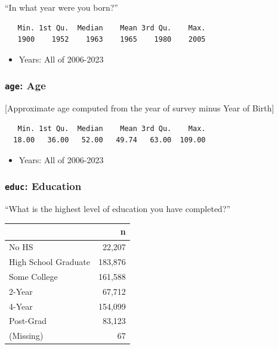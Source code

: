 \documentclass[10pt,article,oneside]{memoir}
\theoremstyle{definition}
\begin{document}
``In what year were you born?''

\begin{verbatim}
   Min. 1st Qu.  Median    Mean 3rd Qu.    Max. 
   1900    1952    1963    1965    1980    2005 
\end{verbatim}

\begin{itemize}
\tightlist
\item
  Years: All of 2006-2023
\end{itemize}

\subsubsection{\texorpdfstring{\texttt{age}:
Age}{age: Age}}\label{age-age}

{[}Approximate age computed from the year of survey minus Year of
Birth{]}

\begin{verbatim}
   Min. 1st Qu.  Median    Mean 3rd Qu.    Max. 
  18.00   36.00   52.00   49.74   63.00  109.00 
\end{verbatim}

\begin{itemize}
\tightlist
\item
  Years: All of 2006-2023
\end{itemize}

\subsubsection{\texorpdfstring{\texttt{educ}:
Education}{educ: Education}}\label{educ-education}

``What is the highest level of education you have completed?''

\begin{table}[H]
\centering
\begin{tabular}[t]{lr}
\toprule
 & n\\
\midrule
No HS & 22,207\\
High School Graduate & 183,876\\
Some College & 161,588\\
2-Year & 67,712\\
4-Year & 154,099\\
Post-Grad & 83,123\\
(Missing) & 67\\
\bottomrule
\end{tabular}
\end{table}
\end{document}
